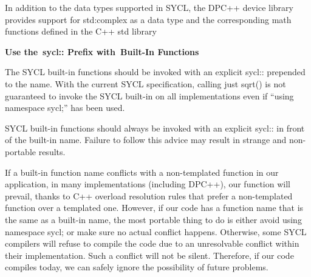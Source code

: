In addition to the data types supported in SYCL, the DPC++ device library provides support for std:complex as a data type and the corresponding math functions defined in the C++ std library\par

\hspace*{\fill} \par %
\textbf{Use the sycl:: Prefix with Built-In Functions}

The SYCL built-in functions should be invoked with an explicit sycl:: prepended to the name. With the current SYCL specification, calling just sqrt() is not guaranteed to invoke the SYCL built-in on all implementations even if “using namespace sycl;” has been used.\par

\begin{tcolorbox}[colback=red!5!white,colframe=red!75!black]
SYCL built-in functions should always be invoked with an explicit sycl:: in front of the built-in name. Failure to follow this advice may result in strange and non-portable results.
\end{tcolorbox}

If a built-in function name conflicts with a non-templated function in our application, in many implementations (including DPC++), our function will prevail, thanks to C++ overload resolution rules that prefer a non-templated function over a templated one. However, if our code has a function name that is the same as a built-in name, the most portable thing to do is either avoid using namespace sycl; or make sure no actual conflict happens. Otherwise, some SYCL compilers will refuse to compile the code due to an unresolvable conflict within their implementation. Such a conflict will not be silent. Therefore, if our code compiles today, we can safely ignore the possibility of future problems.\par

